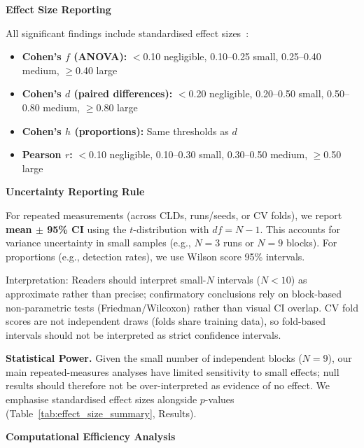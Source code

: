 \noindent\textbf{Effect Size Reporting}
\label{sec:effect_sizes}

All significant findings include standardised effect sizes~\cite{cohen1988statistical}:
\begin{itemize}[noitemsep]
    \item \textbf{Cohen's $f$ (ANOVA):} $<$0.10 negligible, 0.10--0.25 small, 0.25--0.40 medium, $\geq$0.40 large
    \item \textbf{Cohen's $d$ (paired differences):} $<$0.20 negligible, 0.20--0.50 small, 0.50--0.80 medium, $\geq$0.80 large
    \item \textbf{Cohen's $h$ (proportions):} Same thresholds as $d$
    \item \textbf{Pearson $r$:} $<$0.10 negligible, 0.10--0.30 small, 0.30--0.50 medium, $\geq$0.50 large
\end{itemize}

\noindent\textbf{Uncertainty Reporting Rule}
\label{sec:uncertainty_rule}

For repeated measurements (across CLDs, runs/seeds, or CV folds), we report \textbf{mean $\pm$ 95\% CI} using the $t$-distribution with $df = N-1$. This accounts for variance uncertainty in small samples (e.g., $N=3$ runs or $N=9$ blocks). For proportions (e.g., detection rates), we use Wilson score 95\% intervals.

Interpretation: Readers should interpret small-$N$ intervals ($N < 10$) as approximate rather than precise; confirmatory conclusions rely on block-based non-parametric tests (Friedman/Wilcoxon) rather than visual CI overlap. CV fold scores are not independent draws (folds share training data), so fold-based intervals should not be interpreted as strict confidence intervals.

\textbf{Statistical Power.} Given the small number of independent blocks ($N=9$), our main repeated-measures analyses have limited sensitivity to small effects; null results should therefore not be over-interpreted as evidence of no effect. We emphasise standardised effect sizes alongside $p$-values (Table~\ref{tab:effect_size_summary}, Results).

\noindent\textbf{Computational Efficiency Analysis}
\label{sec:computational_efficiency}

